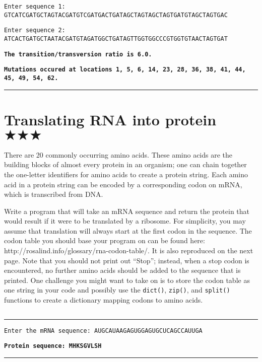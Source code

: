 \documentclass[12pt, letterpaper]{article}
\begin{document}
\texttt{Enter sequence 1: GTCATCGATGCTAGTACGATGTCGATGACTGATAGCTAGTAGCTAGTGATGTAGCTAGTGAC}

\texttt{Enter sequence 2: ATCACTGATGCTAATACGATGTAGATGGCTGATAGTTGGTGGCCCGTGGTGTAACTAGTGAT}

\texttt{\bfseries The transition/transversion ratio is 6.0.}

\texttt{\bfseries Mutations occured at locations 1, 5, 6, 14, 23, 28, 36, 38, 41, 44, 45, 49, 54, 62.}

\vspace{2mm}\hrule\vspace{2mm}

\section{\upshape Translating RNA into protein $\bigstar\bigstar\bigstar$}
There are 20 commonly occurring amino acids. These amino acids are the building blocks of almost every protein in an organism; one can chain together the one-letter identifiers for amino acids to create a protein string. Each amino acid in a protein string can be encoded by a corresponding codon on mRNA, which is transcribed from DNA.

Write a program that will take an mRNA sequence and return the protein that would result if it were to be translated by a ribosome. For simplicity, you may assume that translation will always start at the first codon in the sequence. The codon table you should base your program on can be found here: http://rosalind.info/glossary/rna-codon-table/. It is also reproduced on the next page. Note that you should not print out ``Stop''; instead, when a stop codon is encountered, no further amino acids should be added to the sequence that is printed. One challenge you might want to take on is to store the codon table as one string in your code and possibly use the \texttt{dict()}, \texttt{zip()}, and \texttt{split()} functions to create a dictionary mapping codons to amino acids.

\inputminted[bgcolor=bg,obeytabs=true,samepage=true,tabsize=4]{python}{ex03sols/table.txt}


\vspace{2mm}\hrule\vspace{2mm}

\texttt{Enter the mRNA sequence: AUGCAUAAGAGUGGAGUGCUCAGCCAUUGA}

\texttt{\bfseries Protein sequence: MHKSGVLSH}

\vspace{2mm}\hrule\vspace{2mm}
\end{document}
